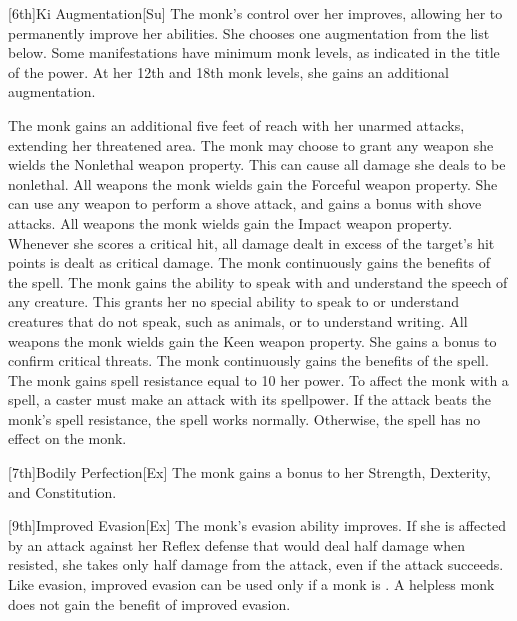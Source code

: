 
[6th]{Ki Augmentation}[Su]
The monk's control over her \ki improves, allowing her to permanently improve her abilities.
She chooses one \ki augmentation from the list below.
Some \ki manifestations have minimum monk levels, as indicated in the title of the power.
At her 12th and 18th monk levels, she gains an additional \ki augmentation.

The monk gains an additional five feet of reach with her unarmed attacks, extending her threatened area.
The monk may choose to grant any weapon she wields the Nonlethal weapon property.
This can cause all damage she deals to be nonlethal.
All weapons the monk wields gain the Forceful weapon property.
She can use any weapon to perform a shove attack, and gains a  bonus with shove attacks.
All weapons the monk wields gain the Impact weapon property.
Whenever she scores a critical hit, all damage dealt in excess of the target's hit points is dealt as critical damage.
The monk continuously gains the benefits of the  spell.
The monk gains the ability to speak with and understand the speech of any creature.
This grants her no special ability to speak to or understand creatures that do not speak, such as animals, or to understand writing.
All weapons the monk wields gain the Keen weapon property.
She gains a  bonus to confirm critical threats.
The monk continuously gains the benefits of the  spell.
The monk gains spell resistance equal to 10 \add her \ki power.
To affect the monk with a spell, a caster must make an attack with its spellpower.
If the attack beats the monk's spell resistance, the spell works normally.
Otherwise, the spell has no effect on the monk.

[7th]{Bodily Perfection}[Ex]
The monk gains a  bonus to her Strength, Dexterity, and Constitution.

[9th]{Improved Evasion}[Ex]
The monk's evasion ability improves.
If she is affected by an attack against her Reflex defense that would deal half damage when resisted, she takes only half damage from the attack, even if the attack succeeds.
Like evasion, improved evasion can be used only if a monk is \unencumbered.
A helpless monk does not gain the benefit of improved evasion.

